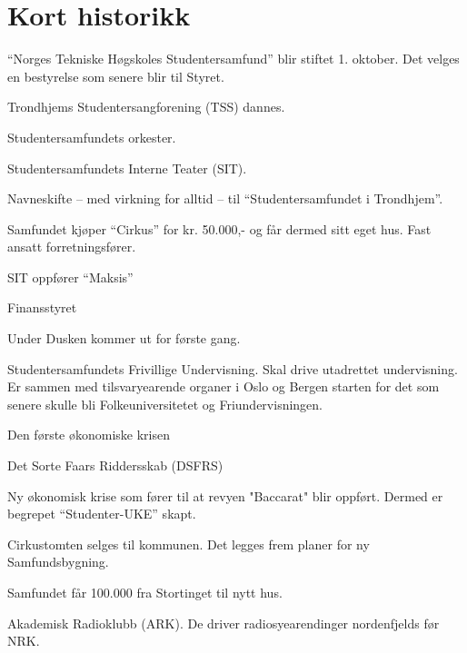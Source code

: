 \chapter*{Kort historikk}

	\item ``Norges Tekniske Høgskoles Studentersamfund'' blir stiftet 1. oktober. Det velges en bestyrelse som senere blir
	til Styret.
	\item Trondhjems Studentersangforening (TSS) dannes.
    \item Studentersamfundets orkester.
    \item Studentersamfundets Interne Teater (SIT).
\yearend

	\item Navneskifte -- med virkning for alltid -- til ``Studentersamfundet i Trondhjem''.
  \item Samfundet kjøper ``Cirkus'' for kr. 50.000,- og får dermed sitt eget hus. Fast ansatt forretningsfører.
\yearend 

  \item SIT oppfører ``Maksis''
  \item Finansstyret
\yearend 

  \item Under Dusken kommer ut for første gang.
  \item Studentersamfundets Frivillige Undervisning. Skal drive utadrettet undervisning. Er sammen med tilsvaryearende
organer i Oslo og Bergen starten for det som senere skulle bli Folkeuniversitetet og Friundervisningen.
\yearend 

  \item Den første økonomiske krisen
\yearend 

  \item Det Sorte Faars Riddersskab (DSFRS)
\yearend 

  \item Ny økonomisk krise som fører til at revyen "Baccarat" blir oppført. Dermed er begrepet ``Studenter-UKE'' skapt.
\yearend 

  \item Cirkustomten selges til kommunen. Det legges frem planer for ny Samfundsbygning.
\yearend 

  \item Samfundet får 100.000 fra Stortinget til nytt hus.
\yearend 

  \item Akademisk Radioklubb (ARK). De driver radiosyearendinger nordenfjelds før NRK.
\yearend 

